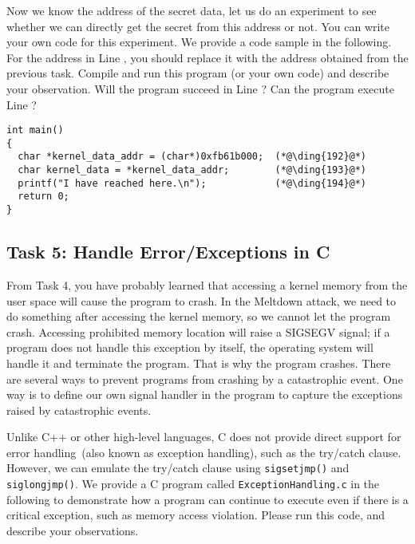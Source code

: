 Now we know the address of the secret data, let us do an experiment to see 
whether we can directly get the secret from this address or not. 
You can write your own code for this experiment. We provide
a code sample in the following. For the address in Line , 
you should replace it with the address obtained from the previous task. 
Compile and run this program (or your own code) and describe your observation. 
Will the program succeed in Line ? Can the program execute 
Line ?

\begin{lstlisting}
int main()
{
  char *kernel_data_addr = (char*)0xfb61b000;  (*@\ding{192}@*)
  char kernel_data = *kernel_data_addr;        (*@\ding{193}@*)
  printf("I have reached here.\n");            (*@\ding{194}@*)
  return 0;
}
\end{lstlisting}



\subsection{Task 5: Handle Error/Exceptions in C}


From Task 4, you have probably learned that accessing a kernel memory from the user space will
cause the program to crash. In the Meltdown attack, we need to do something 
after accessing the kernel memory, so we cannot let the program crash. 
Accessing prohibited memory location will raise a SIGSEGV signal; if a program does not 
handle this exception by itself, the operating system will handle it and terminate the 
program. That is why the program crashes. There are several ways to prevent
programs from crashing by a catastrophic event. 
One way is to define our own signal handler in the program to capture
the exceptions raised by catastrophic events. 


Unlike C++ or other high-level languages, C does not provide direct support
for error handling~(also 
known as exception handling), such as the try/catch clause. 
However, we can emulate the try/catch clause using \texttt{sigsetjmp()} and \texttt{siglongjmp()}.
We provide a C program called \texttt{ExceptionHandling.c} in the following 
to demonstrate how
a program can continue to execute even if there is a critical exception, such as memory access
violation. Please run this code, and describe your observations. 


